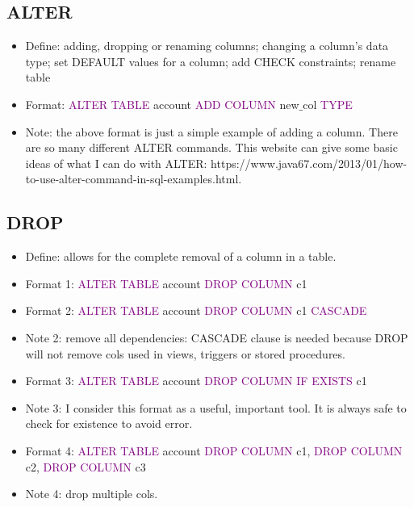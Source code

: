 \documentclass[a4paper]{article}
\begin{document}
\subsection{ALTER}
\begin{itemize}
  \item Define: adding, dropping or renaming columns; changing a column's data type; set DEFAULT values for a column; add CHECK constraints; rename table
  \item Format: \textcolor{purple}{ALTER TABLE} account \textcolor{purple}{ADD COLUMN} new$\_$col \textcolor{purple}{TYPE}
  \item Note: the above format is just a simple example of adding a column. There are so many different ALTER commands. This website can give some basic ideas of what I can do with ALTER: https://www.java67.com/2013/01/how-to-use-alter-command-in-sql-examples.html.
\end{itemize}

\subsection{DROP}
\begin{itemize}
  \item Define: allows for the complete removal of a column in a table.
  \item Format 1: \textcolor{purple}{ALTER TABLE} account \textcolor{purple}{DROP COLUMN} c1
  \item Format 2: \textcolor{purple}{ALTER TABLE} account \textcolor{purple}{DROP COLUMN} c1 \textcolor{purple}{CASCADE} 
  \item Note 2: remove all dependencies: CASCADE clause is needed because DROP will not remove cols used in views, triggers or stored procedures.
  \item Format 3: \textcolor{purple}{ALTER TABLE} account \textcolor{purple}{DROP COLUMN IF EXISTS} c1
  \item Note 3: I consider this format as a useful, important tool. It is always safe to check for existence to avoid error.
  \item Format 4: \textcolor{purple}{ALTER TABLE} account \textcolor{purple}{DROP COLUMN} c1,  \textcolor{purple}{DROP COLUMN} c2, \textcolor{purple}{DROP COLUMN} c3
  \item Note 4: drop multiple cols.
\end{itemize}
\end{document}
